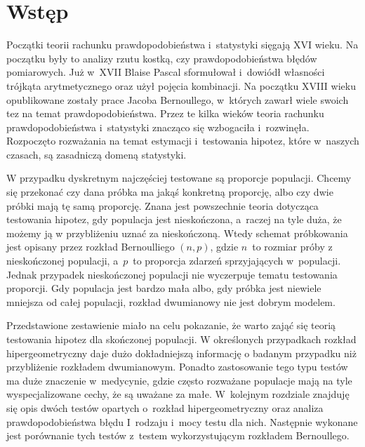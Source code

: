 \chapter*{Wstęp}
Początki teorii rachunku prawdopodobieństwa i~statystyki sięgają XVI wieku. Na początku były to analizy rzutu kostką, czy prawdopodobieństwa błędów pomiarowych. Już w~XVII Blaise Pascal sformułował i~dowiódł własności trójkąta arytmetycznego oraz użył pojęcia kombinacji. Na początku XVIII wieku opublikowane zostały prace Jacoba Bernoullego, w~których zawarł wiele swoich tez na temat prawdopodobieństwa. Przez te kilka wieków teoria rachunku prawdopodobieństwa i~statystyki znacząco się wzbogaciła i~rozwinęła. Rozpoczęto rozważania na temat estymacji i~testowania hipotez, które w~naszych czasach, są zasadniczą domeną statystyki.

W przypadku dyskretnym najczęściej testowane są proporcje populacji. Chcemy się przekonać czy dana próbka ma jakąś konkretną proporcję, albo czy dwie próbki mają tę samą proporcję. Znana jest powszechnie teoria dotycząca testowania hipotez, gdy populacja jest nieskończona, a~raczej na tyle duża, że możemy ją w przybliżeniu uznać za nieskończoną. Wtedy schemat próbkowania jest opisany przez rozkład Bernoulliego $(n,p)$, gdzie $n$~to rozmiar próby z nieskończonej populacji, a~$p$~to proporcja zdarzeń sprzyjających w~populacji. Jednak przypadek nieskończonej populacji nie wyczerpuje tematu testowania proporcji. Gdy populacja jest bardzo mała albo, gdy próbka jest niewiele mniejsza od całej populacji, rozkład dwumianowy nie jest dobrym modelem.

Przedstawione zestawienie miało na celu pokazanie, że warto zająć się teorią testowania hipotez dla skończonej populacji. W określonych przypadkach rozkład hipergeometryczny daje dużo dokładniejszą informację o badanym przypadku niż przybliżenie rozkładem dwumianowym. Ponadto zastosowanie tego typu testów ma duże znaczenie w~medycynie, gdzie często rozważane populacje mają na tyle wyspecjalizowane cechy, że są uważane za małe. W~kolejnym rozdziale znajduję się opis dwóch testów opartych o~rozkład hipergeometryczny oraz analiza prawdopodobieństwa błędu I~rodzaju i~mocy testu dla nich. Następnie wykonane jest porównanie tych testów z~testem wykorzystującym rozkładem Bernoullego.